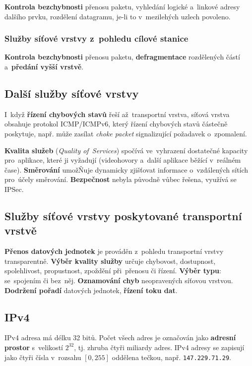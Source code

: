 \textbf{Kontrola bezchybnosti} přenosu paketu, vyhledání logické a~linkové adresy dalšího prvku, rozdělení datagramu, je-li to v~mezilehých uzlech povoleno.

\subsubsection{Služby síťové vrstvy z~pohledu cílové stanice}

\textbf{Kontrola bezchybnosti} přenosu paketu, \textbf{defragmentace} rozdělených částí a~\textbf{předání vyšší vrstvě}.

\subsection{Další služby síťové vrstvy}

I~když \textbf{řízení chybových stavů} řeší až~transportní vrstva, síťová vrstva obsahuje protokol ICMP/ICMPv6, který řízení chybových stavů částečně poskytuje, např. může zasílat \emph{choke packet} signalizující požadavek o~zpomalení.

\textbf{Kvalita služeb} (\emph{Quality of~Services}) spočívá ve~vyhrazení dostatečné kapacity pro~aplikace, které ji vyžadují (videohovory a~další aplikace běžící v~reálném čase). \textbf{Směrování} umožŇuje dynamicky zjišťovat informace o~vzdálených sítích pro~účely směrování. \textbf{Bezpečnost} nebyla původně vůbec řešena, využívá se IPSec.

\subsection{Služby síťové vrstvy poskytované transportní vrstvě}

\textbf{Přenos datových jednotek} je prováděn z~pohledu transportní vrstvy transparentně. \textbf{Výběr kvality služby} určuje chybovost, dostupnost, spolehlivost, propustnost, zpoždění při~přenosu či řízení. \textbf{Výběr typu}: se~spojením či bez~něj. \textbf{Oznamování chyb} neopravených síťovou vrstvou. \textbf{Dodržení pořadí} datových jednotek, \textbf{řízení toku dat}.

\subsection{IPv4}

IPv4 adresa má délku 32 bitů. Počet všech adres je označován jako \textbf{adresní prostor} s~velikostí $2^{32}$, tj. zhruba čtyři miliardy adres. IPv4 adresy se zapisují jako čtyři čísla v~rozsahu $[0, 255]$ oddělena tečkou, např. \texttt{147.229.71.29}.

